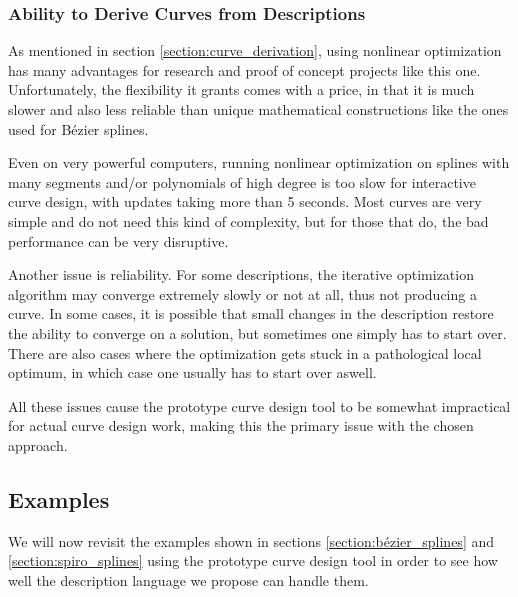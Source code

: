 \documentclass[a4paper]{article}
\begin{document}
			\subsubsection{Ability to Derive Curves from Descriptions}
			\label{section:ability_derive_curves_descriptions}

				As mentioned in section \ref{section:curve_derivation}, using nonlinear optimization has many advantages for research and proof of concept projects like this one. Unfortunately, the flexibility it grants comes with a price, in that it is much slower and also less reliable than unique mathematical constructions like the ones used for Bézier splines.

				Even on very powerful computers, running nonlinear optimization on splines with many segments and/or polynomials of high degree is too slow for interactive curve design, with updates taking more than 5 seconds. Most curves are very simple and do not need this kind of complexity, but for those that do, the bad performance can be very disruptive.

				Another issue is reliability. For some descriptions, the iterative optimization algorithm may converge extremely slowly or not at all, thus not producing a curve. In some cases, it is possible that small changes in the description restore the ability to converge on a solution, but sometimes one simply has to start over. There are also cases where the optimization gets stuck in a pathological local optimum, in which case one usually has to start over aswell.

				All these issues cause the prototype curve design tool to be somewhat impractical for actual curve design work, making this the primary issue with the chosen approach.

		\subsection{Examples}
		\label{section:examples}

			We will now revisit the examples shown in sections \ref{section:bézier_splines} and \ref{section:spiro_splines} using the prototype curve design tool in order to see how well the description language we propose can handle them.
\end{document}
